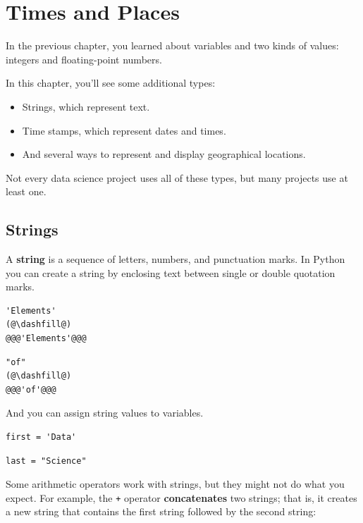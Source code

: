 \hypertarget{times-and-places}{%
\chapter{Times and Places}\label{times-and-places}}

In the previous chapter, you learned about variables and two kinds of
values: integers and floating-point numbers.

In this chapter, you'll see some additional types:

\begin{itemize}
\item
  Strings, which represent text.
\item
  Time stamps, which represent dates and times.
\item
  And several ways to represent and display geographical locations.
\end{itemize}

Not every data science project uses all of these types, but many
projects use at least one.

\hypertarget{strings}{%
\section{Strings}\label{strings}}

A \textbf{string} is a sequence of letters, numbers, and punctuation
marks. In Python you can create a string by enclosing text between
single or double quotation marks.

\begin{lstlisting}[]
'Elements'
(@\dashfill@)
@@@'Elements'@@@
\end{lstlisting}

\begin{lstlisting}[]
"of"
(@\dashfill@)
@@@'of'@@@
\end{lstlisting}

And you can assign string values to variables.

\begin{lstlisting}[]
first = 'Data'
\end{lstlisting}

\begin{lstlisting}[]
last = "Science"
\end{lstlisting}

Some arithmetic operators work with strings, but they might not do what
you expect. For example, the \passthrough{\lstinline!+!} operator
\textbf{concatenates} two strings; that is, it creates a new string that
contains the first string followed by the second string:


